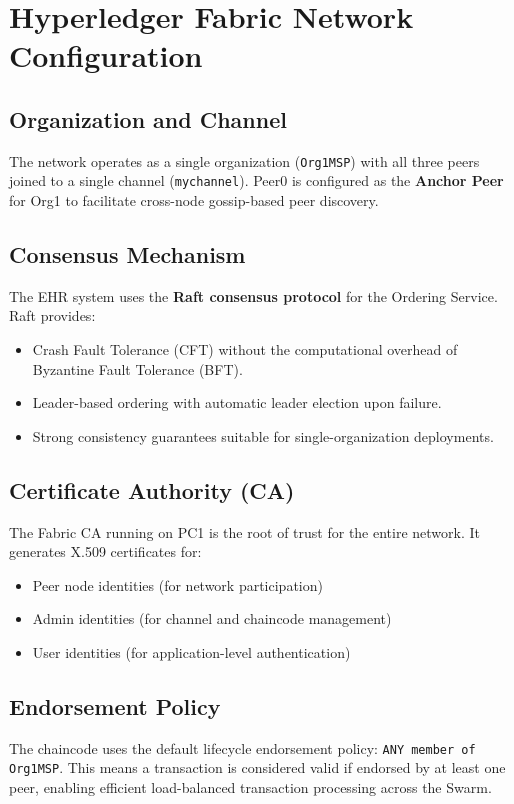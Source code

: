 \section{Hyperledger Fabric Network Configuration}

\subsection{Organization and Channel}
The network operates as a single organization (\texttt{Org1MSP}) with all three peers joined to a single channel (\texttt{mychannel}). Peer0 is configured as the \textbf{Anchor Peer} for Org1 to facilitate cross-node gossip-based peer discovery.

\subsection{Consensus Mechanism}
The EHR system uses the \textbf{Raft consensus protocol} for the Ordering Service. Raft provides:
\begin{itemize}
    \item Crash Fault Tolerance (CFT) without the computational overhead of Byzantine Fault Tolerance (BFT).
    \item Leader-based ordering with automatic leader election upon failure.
    \item Strong consistency guarantees suitable for single-organization deployments.
\end{itemize}

\subsection{Certificate Authority (CA)}
The Fabric CA running on PC1 is the root of trust for the entire network. It generates X.509 certificates for:
\begin{itemize}
    \item Peer node identities (for network participation)
    \item Admin identities (for channel and chaincode management)
    \item User identities (for application-level authentication)
\end{itemize}

\subsection{Endorsement Policy}
The chaincode uses the default lifecycle endorsement policy: \texttt{ANY member of Org1MSP}. This means a transaction is considered valid if endorsed by at least one peer, enabling efficient load-balanced transaction processing across the Swarm.

